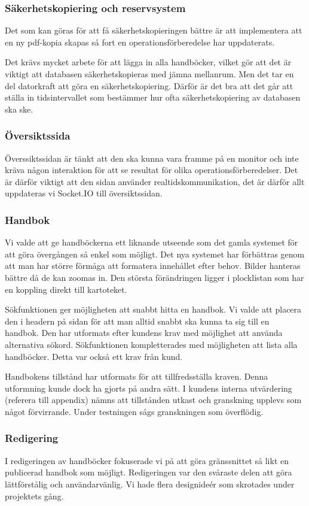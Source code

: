 \documentclass{article}
\begin{document}
\subsubsection{Säkerhetskopiering och reservsystem}
Det som kan göras för att få säkerhetskopieringen bättre är att implementera att en ny pdf-kopia skapas så fort en operationsförberedelse har uppdaterats.

Det krävs mycket arbete för att lägga in alla handböcker, vilket gör att det är viktigt att databasen säkerhetskopieras med jämna mellanrum. Men det tar en del datorkraft att göra en säkerhetskopiering. Därför är det bra att det går att ställa in tidsintervallet som bestämmer hur ofta säkerhetskopiering av databasen ska ske.

\subsubsection{Översiktssida}
Överssiktssidan är tänkt att den ska kunna vara framme på en monitor och inte kräva någon interaktion för att se resultat för olika operationsförberedelser. Det är därför viktigt att den sidan använder realtidskommunikation, det är därför allt uppdateras vi Socket.IO till översiktssidan. 

\subsubsection{Handbok}
Vi valde att ge handböckerna ett liknande utseende som det gamla systemet för att göra övergången så enkel som möjligt. Det nya systemet har förbättras genom att man har större förmåga att formatera innehållet efter behov. Bilder hanteras bättre då de kan zoomas in.
Den största förändringen ligger i plocklistan som har en koppling direkt till kartoteket.

Sökfunktionen ger möjligheten att snabbt hitta en handbok. Vi valde att placera den i headern på sidan för att man alltid snabbt ska kunna ta sig till en handbok. Den har utformats efter kundens krav med möjlighet att använda alternativa sökord.
Sökfunktionen kompletterades med möjligheten att lista alla handböcker. Detta var också ett krav från kund. 

Handbokens tillstånd har utformats för att tillfredsställa kraven. Denna utformning kunde dock ha gjorts på andra sätt. I kundens interna utvärdering (referera till appendix) nämns att tillstånden utkast och granskning upplevs som något förvirrande. Under testningen sågs granskningen som överflödig.
\subsubsection{Redigering}
I redigeringen av handböcker fokuserade vi på att göra gränssnittet så likt en publicerad handbok som möjligt. Redigeringen var den svåraste delen att göra lättförstålig och användarvänlig. Vi hade flera designideér som skrotades under projektets gång.
\end{document}
